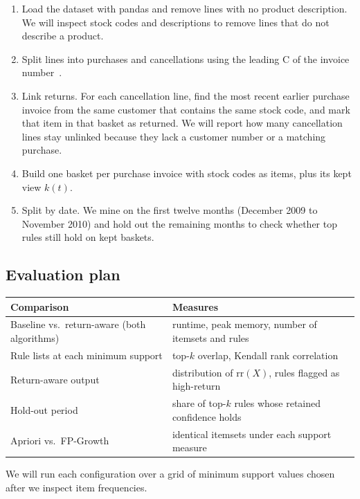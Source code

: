 \documentclass[11pt,a4paper]{article}
\begin{document}
\begin{enumerate}
  \item Load the dataset with pandas and remove lines with no product description. We will inspect stock codes and descriptions to remove lines that do not describe a product.
  \item Split lines into purchases and cancellations using the leading C of the invoice number~\cite{uci_oretail2}.
  \item Link returns. For each cancellation line, find the most recent earlier purchase invoice from the same customer that contains the same stock code, and mark that item in that basket as returned. We will report how many cancellation lines stay unlinked because they lack a customer number or a matching purchase.
  \item Build one basket per purchase invoice with stock codes as items, plus its kept view $k(t)$.
  \item Split by date. We mine on the first twelve months (December 2009 to November 2010) and hold out the remaining months to check whether top rules still hold on kept baskets.
\end{enumerate}

\subsection*{Evaluation plan}

\begin{center}
\small
\begin{tabular}{@{}ll@{}}
\toprule
Comparison & Measures \\
\midrule
Baseline vs.\ return-aware (both algorithms) & runtime, peak memory, number of itemsets and rules \\
Rule lists at each minimum support & top-$k$ overlap, Kendall rank correlation \\
Return-aware output & distribution of $\mathrm{rr}(X)$, rules flagged as high-return \\
Hold-out period & share of top-$k$ rules whose retained confidence holds \\
Apriori vs.\ FP-Growth & identical itemsets under each support measure \\
\bottomrule
\end{tabular}
\end{center}

We will run each configuration over a grid of minimum support values chosen after we inspect item frequencies.
\end{document}
